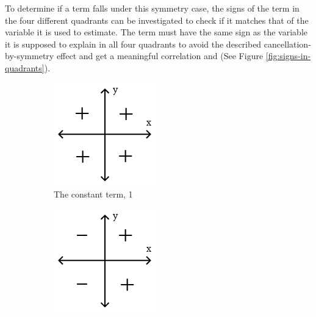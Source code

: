 To determine if a term falls under this symmetry case, the signs of the term in the four different quadrants can be investigated to check if it matches that of the variable it is used to estimate. The term must have the same sign as the variable it is supposed to explain in all four quadrants to avoid the described cancellation-by-symmetry effect and get a meaningful correlation and (See Figure \ref{fig:signs-in-quadrants}).

\begin{figure}[ht]
\centering
\begin{subfigure}{.25\textwidth}
  \centering
  \includegraphics[width=0.9\linewidth]{Pictures/signs-in-quadrants-all-plus-cropped.png}
  \caption{The constant term, 1}
  \label{fig:sign-1}
\end{subfigure}
\begin{subfigure}{.25\textwidth}
  \centering
  \includegraphics[width=0.9\linewidth]{Pictures/signs-in-quadrants-vertical-cropped.png}

\end{subfigure}
\end{figure}
